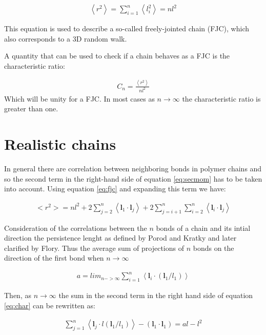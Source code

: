 \begin{gather}
\label{eq:fjc}  
\left<r^2 \right> = \sum_{i=1}^{n}\left<l_{i}^2\right> = nl^2
\end{gather}  

This equation is used to describe a so-called freely-jointed chain
(FJC), which also corresponds to a 3D random walk.

A quantity that can be used to check if a chain behaves as a FJC is the
characteristic ratio:

\begin{gather}
C_{n}=\frac{\left<r^{2}\right>}{nl^{2}}
\end{gather}
Which will be unity for a FJC. In most cases as $n \to \infty$ the
characteristic ratio is greater than one.

\section{Realistic chains}
In general there are  correlation between neighboring bonds in polymer
chains  and so  the second  term in  the right-hand  side  of equation
\ref{eq:secmom}  has  to  be   taken  into  account.   Using  equation
\ref{eq:fjc} and expanding this term we have:

\begin{gather}
\label{eq:char}  
<r^{2}> = nl^{2} + 2 \sum_{j=2}^{n}
\left<  \mathbf{l}_{1} \cdot \mathbf{l}_{j}\right> +
2 \sum_{j=i+1}^{n}\sum_{i=2}^{n}
\left<  \mathbf{l}_{i} \cdot \mathbf{l}_{j}\right>
\end{gather}

Consideration of the correlations between the $n$ bonds of a chain and
its intial  direction the persistence  lenght as defined by  Porod and
Kratky  and  later  clarified  by  Flory.  Thus  the  average  sum  of
projections of  $n$ bonds on the  direction of the first  bond when $n
\to \infty$

\begin{gather}
a    =   lim_{n->\infty}\sum_{i=1}^{n}    \left<\mathbf{l}_{i}   \cdot
(\mathbf{l}_{1}/l_{1}) \right>
\end{gather}
  
Then, as $n \to \infty$ the sum in the second term in the right hand
side of equation \ref{eq:char} can be rewritten as:

\begin{gather}
\sum_{j=1}^{n}   \left<\mathbf{l}_{j}   \cdot  l(\mathbf{l}_{1}/l_{1})
\right> -(\mathbf{l}_{1} \cdot \mathbf{l}_{1}) = al - l^{2}
\end{gather}  

